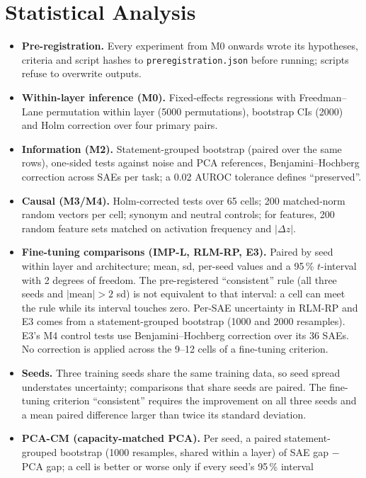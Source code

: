 \section{Statistical Analysis}\label{sec:stats}

\begin{itemize}
  \item \textbf{Pre-registration.} Every experiment from M0 onwards wrote its hypotheses, criteria and script hashes to
        \texttt{preregistration.json} before running; scripts refuse to overwrite outputs.
  \item \textbf{Within-layer inference (M0).} Fixed-effects regressions with Freedman--Lane permutation within layer
        (5000 permutations), bootstrap CIs (2000) and Holm correction over four primary pairs.
  \item \textbf{Information (M2).} Statement-grouped bootstrap (paired over the same rows), one-sided tests against
        noise and PCA references, Benjamini--Hochberg correction across SAEs per task; a 0.02 AUROC tolerance defines
        ``preserved''.
  \item \textbf{Causal (M3/M4).} Holm-corrected tests over 65 cells; 200 matched-norm random vectors per cell; synonym
        and neutral controls; for features, 200 random feature sets matched on activation frequency and $|\Delta z|$.
  \item \textbf{Fine-tuning comparisons (IMP-L, RLM-RP, E3).} Paired by seed within layer and architecture; mean,
        sd, per-seed values and a 95\,\% $t$-interval with 2 degrees of freedom. The pre-registered ``consistent''
        rule (all three seeds and $|$mean$|>2$ sd) is not equivalent to that interval: a cell can meet the rule while
        its interval touches zero. Per-SAE uncertainty in RLM-RP and E3 comes from a statement-grouped bootstrap
        (1000 and 2000 resamples). E3's M4 control tests use Benjamini--Hochberg correction over its 36 SAEs. No
        correction is applied across the 9--12 cells of a fine-tuning criterion.
  \item \textbf{Seeds.} Three training seeds share the same training data, so seed spread understates uncertainty;
        comparisons that share seeds are paired. The fine-tuning criterion ``consistent'' requires the improvement on
        all three seeds and a mean paired difference larger than twice its standard deviation.
  \item \textbf{PCA-CM (capacity-matched PCA).} Per seed, a paired statement-grouped bootstrap (1000 resamples,
        shared within a layer) of SAE gap $-$ PCA gap; a cell is better or worse only if every seed's 95\,\% interval

\end{itemize}
